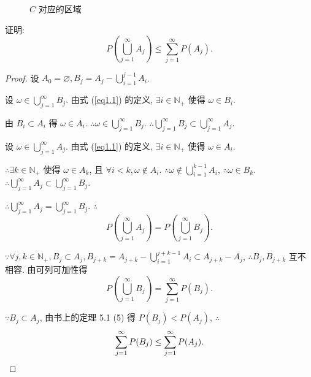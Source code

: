 \documentclass[color=black,device=normal,lang=cn]{elegantnote}
\numberwithin{equation}{section}
\theoremstyle{plain}
\numberwithin{exercise}{exsection}
\begin{document}
\begin{figure}[htbp!]
    \centering
    \caption{$C$ 对应的区域}\label{f1.3}
\end{figure}
\addtocounter{exercise}{2}
\begin{exercise}%
    证明:
    \[P\left(\bigcup\limits_{j=1}^\infty A_j\right)\leq\sum\limits_{j=1}^\infty P(A_j).\]
\end{exercise}
\begin{proof}
    设 $A_0=\varnothing,B_j=A_j-\bigcup\limits_{i=1}^{j-1}A_i$.

    设 $\omega\in\bigcup\limits_{j=1}^\infty B_j$. 由式 (\ref{eq1.1}) 的定义, $\exists i\in\mathbb{N}_+$ 使得 $\omega\in B_i$.
    
    由 $B_i\subset A_i$ 得 $\omega\in A_i$. $\therefore\omega\in\bigcup\limits_{j=1}^\infty B_j$. $\therefore\bigcup\limits_{j=1}^\infty B_j\subset\bigcup\limits_{j=1}^\infty A_j$.

    设 $\omega\in\bigcup\limits_{j=1}^\infty A_j$. 由式 (\ref{eq1.1}) 的定义, $\exists i\in\mathbb{N}_+$ 使得 $\omega\in A_i$.
    
    $\therefore\exists k\in\mathbb{N}_+$ 使得 $\omega\in A_k$, 且 $\forall i<k,\omega\notin A_i$. $\therefore\omega\notin\bigcup\limits_{i=1}^{k-1}A_i$, $\therefore\omega\in B_k$. $\therefore\bigcup\limits_{j=1}^\infty A_j\subset\bigcup\limits_{j=1}^\infty B_j$.
    
    $\therefore\bigcup\limits_{j=1}^\infty A_j=\bigcup\limits_{j=1}^\infty B_j$. $\therefore$
    \[P\left(\bigcup\limits_{j=1}^\infty A_j\right)=P\left(\bigcup\limits_{j=1}^\infty B_j\right).\]

    $\because\forall j,k\in\mathbb{N}_+,B_j\subset A_j,B_{j+k}=A_{j+k}-\bigcup\limits_{i=1}^{j+k-1}A_i\subset  A_{j+k}-A_j$, $\therefore B_j,B_{j+k}$ 互不相容. 由可列可加性得
    \[P\left(\bigcup\limits_{j=1}^\infty B_j\right)=\sum\limits_{j=1}^\infty P(B_j).\]

    $\because B_j\subset A_j$, 由书上的定理 5.1 (5) 得 $P(B_j)<P(A_j)$, $\therefore$
    \[\sum\limits_{j=1}^\infty P(B_j)\leq\sum\limits_{j=1}^\infty P(A_j).\qedhere\]
\end{proof}
\end{document}
